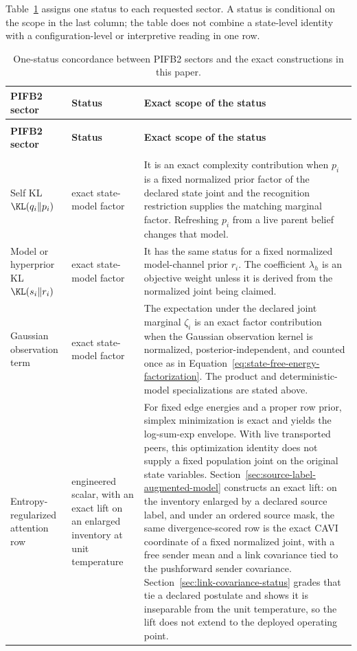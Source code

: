 Table~\ref{tab:pifb2-legacy-concordance} assigns one status to each requested sector. A status is conditional on the scope in the last column; the table does not combine a state-level identity with a configuration-level or interpretive reading in one row.

\small
\begin{longtable}{>{\raggedright\arraybackslash}p{}>{\raggedright\arraybackslash}p{}>{\raggedright\arraybackslash}p{}}
\caption{One-status concordance between PIFB2 sectors and the exact constructions in this paper.}
\label{tab:pifb2-legacy-concordance}\\
\toprule
\textbf{PIFB2 sector} & \textbf{Status} & \textbf{Exact scope of the status} \\
\midrule
\endfirsthead
\multicolumn{3}{l}{\textit{Table \thetable\ continued}}\\
\toprule
\textbf{PIFB2 sector} & \textbf{Status} & \textbf{Exact scope of the status} \\
\midrule
\endhead
\midrule
\multicolumn{3}{r}{\textit{Continued on next page}}\\
\endfoot
\bottomrule
\endlastfoot
Self KL \(\KL(q_i\Vert p_i)\) &
exact state-model factor &
It is an exact complexity contribution when \(p_i\) is a fixed normalized prior factor of the declared state joint and the recognition restriction supplies the matching marginal factor. Refreshing \(p_i\) from a live parent belief changes that model.\\
Model or hyperprior KL \(\KL(s_i\Vert r_i)\) &
exact state-model factor &
It has the same status for a fixed normalized model-channel prior \(r_i\). The coefficient \(\lambda_h\) is an objective weight unless it is derived from the normalized joint being claimed.\\
Gaussian observation term &
exact state-model factor &
The expectation under the declared joint marginal \(\zeta_i\) is an exact factor contribution when the Gaussian observation kernel is normalized, posterior-independent, and counted once as in Equation~\eqref{eq:state-free-energy-factorization}. The product and deterministic-model specializations are stated above.\\
Entropy-regularized attention row &
engineered scalar, with an exact lift on an enlarged inventory at unit temperature &
For fixed edge energies and a proper row prior, simplex minimization is exact and yields the log-sum-exp envelope. With live transported peers, this optimization identity does not supply a fixed population joint on the original state variables. Section~\ref{sec:source-label-augmented-model} constructs an exact lift: on the inventory enlarged by a declared source label, and under an ordered source mask, the same divergence-scored row is the exact CAVI coordinate of a fixed normalized joint, with a free sender mean and a link covariance tied to the pushforward sender covariance. Section~\ref{sec:link-covariance-status} grades that tie a declared postulate and shows it is inseparable from the unit temperature, so the lift does not extend to the deployed operating point.\\

\end{longtable}
